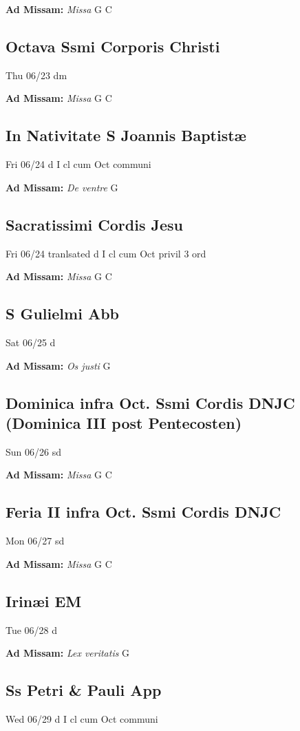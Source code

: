 \documentclass[letterpaper, 10pt, twocolumn]{article}
\begin{document}
\textbf{Ad Missam:} \textit{Missa} G C 

\subsection*{Octava Ssmi Corporis Christi}Thu 06/23 dm

\textbf{Ad Missam:} \textit{Missa} G C 

\subsection*{In Nativitate S Joannis Baptistæ}Fri 06/24 d I cl cum Oct communi

\textbf{Ad Missam:} \textit{De ventre} G 

\subsection*{Sacratissimi Cordis Jesu}Fri 06/24 tranlsated d I cl cum Oct privil 3 ord

\textbf{Ad Missam:} \textit{Missa} G C 

\subsection*{S Gulielmi Abb}Sat 06/25 d

\textbf{Ad Missam:} \textit{Os justi} G 

\subsection*{Dominica infra Oct. Ssmi Cordis DNJC (Dominica III post Pentecosten)}Sun 06/26 sd

\textbf{Ad Missam:} \textit{Missa} G C 

\subsection*{Feria II infra Oct. Ssmi Cordis DNJC}Mon 06/27 sd

\textbf{Ad Missam:} \textit{Missa} G C 

\subsection*{Irinæi EM}Tue 06/28 d

\textbf{Ad Missam:} \textit{Lex veritatis} G 

\subsection*{Ss Petri \& Pauli App}Wed 06/29 d I cl cum Oct communi
\end{document}
